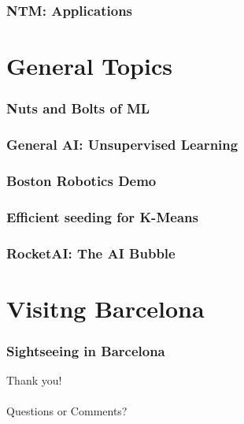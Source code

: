 \documentclass[11pt,
               hyperref={colorlinks,citecolor=pink,linkcolor=red,urlcolor=blue}
               ]{beamer}
\begin{document}
  \begin{frame}
    \frametitle{NTM: Applications}

  \end{frame}

  \section{General Topics}

  \begin{frame}
    \frametitle{Nuts and Bolts of ML}

  \end{frame}

  \begin{frame}
    \frametitle{General AI: Unsupervised Learning}

  \end{frame}

  \begin{frame}
    \frametitle{Boston Robotics Demo}

  \end{frame}

  \begin{frame}
    \frametitle{Efficient seeding for K-Means}

  \end{frame}

  \begin{frame}
    \frametitle{RocketAI: The AI Bubble}

  \end{frame}

  \section{Visitng Barcelona}

  \begin{frame}
    \frametitle{Sightseeing in Barcelona}

  \end{frame}

  \begin{frame}[noframenumbering]

    \begin{center}
      \Huge{Thank you!}\\~\\
      \huge{Questions or Comments?}
    \end{center}
  \end{frame}
\end{document}

